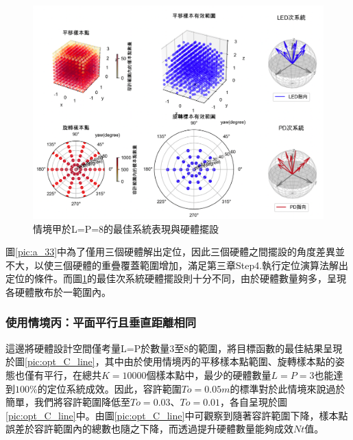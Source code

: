     \begin{figure}[htpb]
        \centering
        \includegraphics[width=15cm]{ch5pic/a_88.png}
        \caption{情境甲於L=P=8的最佳系統表現與硬體擺設}
        \label{pic:a_88}
    \end{figure}

    圖\ref{pic:a_33}中為了僅用三個硬體解出定位，因此三個硬體之間擺設的角度差異並不大，以使三個硬體的重疊覆蓋範圍增加，滿足第三章Step4.執行定位演算法解出定位的條件。而圖\ref{pic:a_88}的最佳次系統硬體擺設則十分不同，由於硬體數量夠多，呈現各硬體散布於一範圍內。




    \subsubsection{使用情境丙：平面平行且垂直距離相同}
    \label{chp:optimize_C}

    這邊將硬體設計空間僅考量L=P於數量3至8的範圍，將目標函數的最佳結果呈現於圖\ref{pic:opt_C_line}，其中由於使用情境丙的平移樣本點範圍、旋轉樣本點的姿態也僅有平行，在總共$K=10000$個樣本點中，最少的硬體數量$L=P=3$也能達到$100\%$的定位系統成效。因此，容許範圍$To=0.05m$的標準對於此情境來說過於簡單，我們將容許範圍降低至$To=0.03$、$To=0.01$，各自呈現於圖\ref{pic:opt_C_line}中。由圖\ref{pic:opt_C_line}中可觀察到隨著容許範圍下降，樣本點誤差於容許範圍內的總數也隨之下降，而透過提升硬體數量能夠成效$Nt$值。
    

